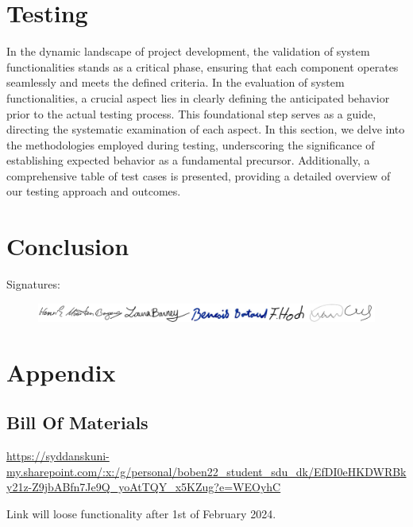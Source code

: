 \documentclass[11pt,table]{article}
\begin{document}
\section{Testing}
    In the dynamic landscape of project development, the validation of system
    functionalities stands as a critical phase, ensuring that each component
    operates seamlessly and meets the defined criteria. In the evaluation of system
    functionalities, a crucial aspect lies in clearly defining the anticipated
    behavior prior to the actual testing process. This foundational step serves as
    a guide, directing the systematic examination of each aspect. In this section,
    we delve into the methodologies employed during testing, underscoring the
    significance of establishing expected behavior as a fundamental precursor.
    Additionally, a comprehensive table of test cases is presented, providing a
    detailed overview of our testing approach and outcomes.
    
    
    
\section{Conclusion}
    

Signatures:
\begin{figure}[H]
    \centering
    \includegraphics[width=1\textwidth]{Signatures.png}
 \end{figure}
\newpage
\section{Appendix}

\begin{multicols}{2}
    
\end{multicols}


\subsection{Bill Of Materials}
\url{https://syddanskuni-my.sharepoint.com/:x:/g/personal/boben22_student_sdu_dk/EfDI0eHKDWRBky21z-Z9jbABfn7Je9Q_yoAtTQY_x5KZug?e=WEOyhC}

Link will loose functionality after 1st of February 2024.

\newpage
\printbibliography
\end{document}

